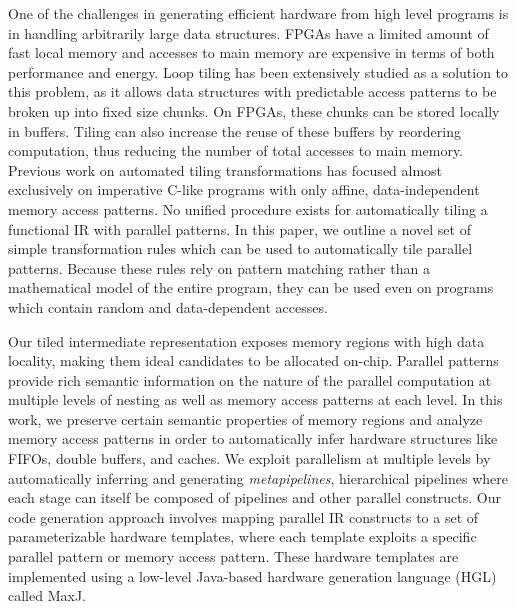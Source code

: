 \documentclass[pageno]{jpaper}
\begin{document}
One of the challenges in generating efficient hardware from high level programs is in handling arbitrarily large data structures. FPGAs have a
limited amount of fast local memory and accesses to main memory are expensive in terms of both performance and energy.
Loop tiling has been extensively studied as a solution to this problem, as it allows data structures with predictable access patterns to be broken up into fixed size
chunks. On FPGAs, these chunks can be stored locally in buffers. Tiling can also increase the reuse of these buffers by reordering computation,
thus reducing the number of total accesses to main memory.
Previous work on automated tiling transformations has focused almost exclusively
on imperative C-like programs with only affine, data-independent memory access patterns.
No unified procedure exists for automatically tiling a functional IR
with parallel patterns. In this paper, we outline a novel set of simple transformation
rules which can be used to automatically tile parallel patterns.
Because these rules rely on pattern matching rather than a mathematical model of the entire program, they can be used
even on programs which contain random and data-dependent accesses.




Our tiled intermediate representation exposes memory regions with high data locality, making them ideal candidates to be allocated on-chip. Parallel patterns provide
rich semantic information on the nature of the parallel computation at multiple levels of nesting as well as memory access patterns at each level.
In this work, we preserve certain semantic properties of memory regions and analyze memory access patterns in order to automatically infer
hardware structures like FIFOs, double buffers, and caches.
We exploit parallelism at multiple levels by automatically inferring and generating \emph{metapipelines}, hierarchical pipelines
where each stage can itself be composed of pipelines and other parallel constructs. Our code generation approach involves mapping parallel IR constructs
to a set of parameterizable hardware templates, where each template exploits a specific parallel pattern or memory access pattern.
These hardware templates are implemented using a low-level Java-based hardware generation language (HGL) called MaxJ.
\end{document}
